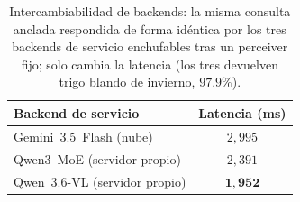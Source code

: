 \begin{table}[htbp]
\caption{Intercambiabilidad de backends: la misma consulta anclada respondida de
forma idéntica por los tres backends de servicio enchufables tras un perceiver
fijo; solo cambia la latencia (los tres devuelven trigo blando de invierno,
$97.9\%$).}
\label{tab:backend-switch}
\centering
\begin{tabular}{lc}
\toprule
\textbf{Backend de servicio} & \textbf{Latencia (ms)} \\
\midrule
Gemini~3.5~Flash (nube)       & $2{,}995$ \\
Qwen3~MoE (servidor propio) & $2{,}391$ \\
Qwen~3.6-VL (servidor propio)  & $\mathbf{1{,}952}$ \\
\bottomrule
\end{tabular}
\end{table}

